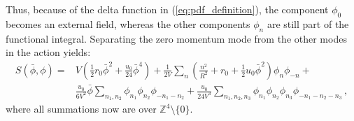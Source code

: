 \documentclass[11pt,a4paper]{article}
\begin{document}
Thus, because of the delta function in (\ref{eq:pdf_definition}), the component
$\phi_{0}$ becomes an external field, whereas the other components $\phi_{n}$
are still part of the functional integral. Separating the zero momentum mode
from the other modes in the action yields:
\begin{equation}
\begin{split}
    S(\bar{\phi}, \phi) =& 
    V \left(\frac{1}{2} r_0 \bar{\phi}^2 + \frac{u_0}{24} \bar{\phi}^4\right) +
    \frac{1}{2V} \sum_{n} \left(\frac{n^2}{R^2} + r_0 +
      \frac{1}{2} u_0\bar{\phi}^2 \right)\phi_{n} \phi_{-n} +\\
    &\frac{u_0}{6V^2} \bar{\phi} 
        \sum_{n_1, n_2} \phi_{n_1} \phi_{n_2} \phi_{-n_1 -n_2} +
    \frac{u_0}{24V^3} \sum_{n_1, n_2, n_3} \phi_{n_1} \phi_{n_2}
        \phi_{n_3} \phi_{-n_1 -n_2 -n_3}\,,
\end{split}
\end{equation}
where all summations now are over $\mathbb{Z}^4 \setminus \{0\}$.
\end{document}
